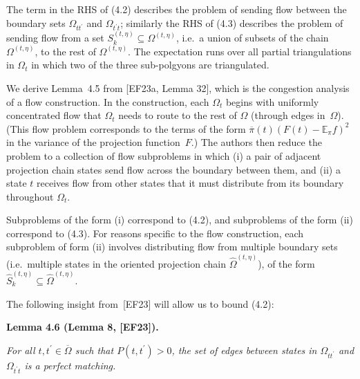 


The term in the RHS of (4.2) describes the problem of sending flow between the boundary sets $\Omega_{tt^{\prime}}$ and $\Omega_{t^{\prime}t}$; similarly the RHS of (4.3) describes the problem of sending flow from a set $S_{k}^{(t,\eta)}\subseteq\Omega^{(t,\eta)}$, i.e. a union of subsets of the chain $\Omega^{(t,\eta)}$, to the rest of $\Omega^{(t,\eta)}$. The expectation runs over all partial triangulations in $\Omega_{t}$ in which two of the three sub-polgyons are triangulated.\par




We derive Lemma 4.5 from [EF23a, Lemma 32], which is the congestion analysis of a flow construction. In the construction, each $\Omega_{t}$ begins with uniformly concentrated flow that $\Omega_{t}$ needs to route to the rest of $\Omega$ (through edges in $\Omega$). (This flow problem corresponds to the terms of the form $\overline{\pi}(t)(F(t)-\mathbb{E}_{\pi}f)^{2}$ in the variance of the projection function $F$.) The authors then reduce the problem to a collection of flow subproblems in which (i) a pair of adjacent projection chain states send flow across the boundary between them, and (ii) a state $t$ receives flow from other states that it must distribute from its boundary throughout $\Omega_{t}$.\par




Subproblems of the form (i) correspond to (4.2), and subproblems of the form (ii) correspond to (4.3). For reasons specific to the flow construction, each subproblem of form (ii) involves distributing flow from multiple boundary sets (i.e. multiple states in the oriented projection chain $\hat{\Omega}^{(t,\eta)}$), of the form $\hat{S}_{k}^{(t,\eta)}\subseteq\hat{\Omega}^{(t,\eta)}$.\par




The following insight from [EF23] will allow us to bound (4.2):\par





\par\medskip\noindent\textbf{\textbf{Lemma 4.6}\textbf{ }(Lemma 8, [EF23])\textbf{.}}\par



\emph{For all $t,t^{\prime}\in\overline{\Omega}$ such that $P(t,t^{\prime})>0$,
the set of edges between states in $\Omega_{tt^{\prime}}$ and $\Omega_{t^{\prime}t}$ is a perfect matching.}\par




